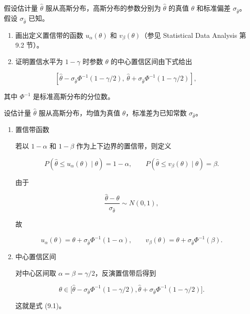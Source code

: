 ﻿





\begin{question}
假设估计量 \(\hat\theta\) 服从高斯分布，高斯分布的参数分别为
\(\hat\theta\) 的真值 \(\theta\) 和标准偏差
\(\sigma_{\hat\theta}\)。假设 \(\sigma_{\hat\theta}\) 已知。

\begin{enumerate}
\item
  画出定义置信带的函数 \(u_\alpha(\theta)\) 和 \(v_\beta(\theta)\)（参见
  Statistical Data Analysis 第 9.2 节）。
\item
  证明置信水平为 \(1-\gamma\) 时参数 \(\theta\) 的中心置信区间由下式给出
\end{enumerate}

\[
\left[\hat\theta-\sigma_{\hat\theta}\Phi^{-1}(1-\gamma/2),\ \hat\theta+\sigma_{\hat\theta}\Phi^{-1}(1-\gamma/2)\right],
\]

其中 \(\Phi^{-1}\) 是标准高斯分布的分位数。
\begin{solution}
设估计量 \(\hat\theta\) 服从高斯分布，均值为真值
\(\theta\)，标准差为已知常数 \(\sigma_{\hat\theta}\)。

\begin{enumerate}
\item 置信带函数

若以 \(1-\alpha\) 和 \(1-\beta\) 作为上下边界的置信带，则定义

\[
P(\hat\theta\le u_\alpha(\theta)\mid \theta)=1-\alpha,
\qquad
P(\hat\theta\le v_\beta(\theta)\mid \theta)=\beta.
\]

由于

\[
\frac{\hat\theta-\theta}{\sigma_{\hat\theta}}\sim N(0,1),
\]

故

\[
u_\alpha(\theta)=\theta+\sigma_{\hat\theta}\Phi^{-1}(1-\alpha),
\qquad
v_\beta(\theta)=\theta+\sigma_{\hat\theta}\Phi^{-1}(\beta).
\]

\item 中心置信区间

对中心区间取 \(\alpha=\beta=\gamma/2\)，反演置信带后得到

\[
\theta\in
\Big[
\hat\theta-\sigma_{\hat\theta}\Phi^{-1}(1-\gamma/2),
\hat\theta+\sigma_{\hat\theta}\Phi^{-1}(1-\gamma/2)
\Big].
\]

这就是式 (9.1)。
\end{enumerate}
\end{solution}
\end{question}



